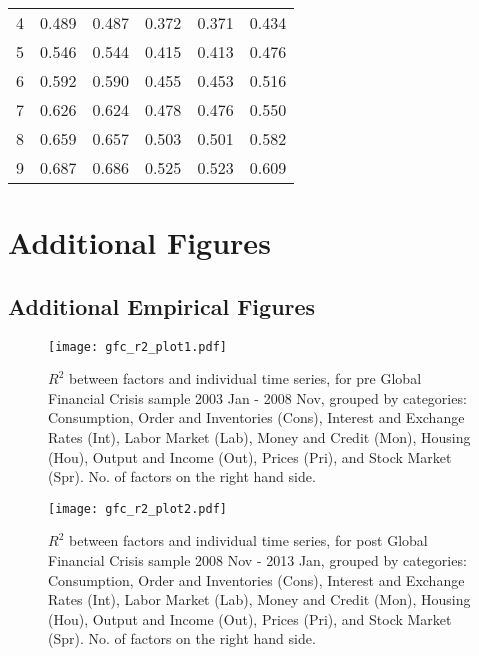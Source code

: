 \documentclass[12pt]{article}
\theoremstyle{plain}
\numberwithin{equation}{section}
\begin{document}
\begin{footnotesize}
\begin{longtable}[t]{cccccc}
\hspace{1em}4 & 0.489 & 0.487 & 0.372 & 0.371 & 0.434\\
\hspace{1em}5 & 0.546 & 0.544 & 0.415 & 0.413 & 0.476\\
\hspace{1em}6 & 0.592 & 0.590 & 0.455 & 0.453 & 0.516\\
\hspace{1em}7 & 0.626 & 0.624 & 0.478 & 0.476 & 0.550\\
\hspace{1em}8 & 0.659 & 0.657 & 0.503 & 0.501 & 0.582\\
\hspace{1em}9 & 0.687 & 0.686 & 0.525 & 0.523 & 0.609\\
\bottomrule
\end{longtable}

\end{footnotesize}
\section{Additional Figures}
\subsection{Additional Empirical Figures}
\label{app:additional_empirical_figures}
\begin{landscape}
\begin{figure}
\label{fig:gfc_r2_plot1}
\texttt{[image: gfc\_r2\_plot1.pdf]}
\caption{$R^2$ between factors and individual time series, for pre Global Financial Crisis sample 2003 Jan - 2008 Nov, grouped by categories: Consumption, Order and Inventories (Cons), Interest and Exchange Rates (Int), Labor Market (Lab), Money and Credit (Mon), Housing (Hou), Output and Income (Out), Prices (Pri), and Stock Market (Spr). No. of factors on the right hand side.}
\end{figure}

\begin{figure}
\label{fig:gfc_r2_plot2}
\texttt{[image: gfc\_r2\_plot2.pdf]}
\caption{$R^2$ between factors and individual time series, for post Global Financial Crisis sample 2008 Nov - 2013 Jan, grouped by categories: Consumption, Order and Inventories (Cons), Interest and Exchange Rates (Int), Labor Market (Lab), Money and Credit (Mon), Housing (Hou), Output and Income (Out), Prices (Pri), and Stock Market (Spr). No. of factors on the right hand side.}
\end{figure}
\end{landscape}
\end{document}
